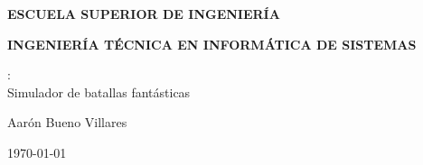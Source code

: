 \begin{titlepage}
\begin{center}
    \LARGE{\textbf{ESCUELA SUPERIOR DE INGENIERÍA}} \\

    \vspace{1.0cm}

    \Large{\textbf{INGENIERÍA TÉCNICA EN INFORMÁTICA DE SISTEMAS}} \\

    \vspace{3.0cm}

    \Large{\gomf:\\ Simulador de batallas fantásticas} \\

    \vspace{2.0cm}

    \Large{Aarón Bueno Villares} \\

    \vspace{0.5cm}

    \large{\today}

  \end{center}
\end{titlepage}
